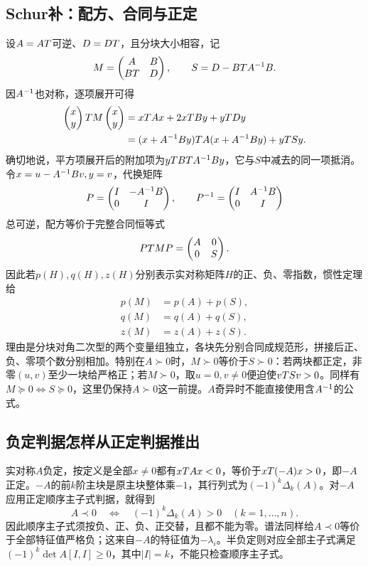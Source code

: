 \subsection{Schur补：配方、合同与正定}\label{der:schur-quadratic}
设$A=AT$可逆、$D=DT$，且分块大小相容，记
\[
M=\begin{pmatrix}A&B\\BT&D\end{pmatrix},\qquad S=D-BT A^{-1} B.
\]
因$A^{-1}$也对称，逐项展开可得
\[
\begin{aligned}
\begin{pmatrix}x\\y\end{pmatrix}T M\begin{pmatrix}x\\y\end{pmatrix}
&=xT Ax+2xT By+yT Dy\\
&=(x+A^{-1} By)T A(x+A^{-1} By)+yT Sy.
\end{aligned}
\]
确切地说，平方项展开后的附加项为$yT BT A^{-1} By$，它与$S$中减去的同一项抵消。令$x=u-A^{-1} Bv,y=v$，代换矩阵
\[
P=\begin{pmatrix}I&-A^{-1} B\\0&I\end{pmatrix},\qquad
P^{-1}=\begin{pmatrix}I&A^{-1} B\\0&I\end{pmatrix}
\]
总可逆，配方等价于完整合同恒等式
\[
PT MP=\begin{pmatrix}A&0\\0&S\end{pmatrix}.
\]
因此若$p(H),q(H),z(H)$分别表示实对称矩阵$H$的正、负、零指数，惯性定理给
\[
\begin{aligned}
p(M)&=p(A)+p(S),\\
q(M)&=q(A)+q(S),\\
z(M)&=z(A)+z(S).
\end{aligned}
\]
理由是分块对角二次型的两个变量组独立，各块先分别合同成规范形，拼接后正、负、零项个数分别相加。特别在$A\succ0$时，$M\succ0$等价于$S\succ0$：若两块都正定，非零$(u,v)$至少一块给严格正；若$M\succ0$，取$u=0,v\ne0$便迫使$vT Sv>0$。同样有$M\succeq0\Longleftrightarrow S\succeq0$，这里仍保持$A\succ0$这一前提。$A$奇异时不能直接使用含$A^{-1}$的公式。

\subsection{负定判据怎样从正定判据推出}\label{der:negative-definite}
实对称$A$负定，按定义是全部$x\ne0$都有$xT Ax<0$，等价于$xT(-A)x>0$，即$-A$正定。$-A$的前$k$阶主块是原主块整体乘$-1$，其行列式为$(-1)^k\Delta_k(A)$。对$-A$应用正定顺序主子式判据，就得到
\[
A\prec0\quad\Longleftrightarrow\quad(-1)^k\Delta_k(A)>0
\quad(k=1,\ldots,n).
\]
因此顺序主子式须按负、正、负、正交替，且都不能为零。谱法同样给$A\prec0$等价于全部特征值严格负；这来自$-A$的特征值为$-\lambda_i$。半负定则对应全部主子式满足$(-1)^k\det A[I,I]\ge0$，其中$|I|=k$，不能只检查顺序主子式。

